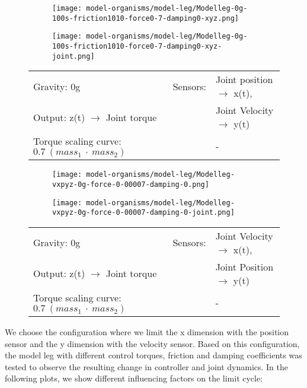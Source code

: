 \documentclass[main]{subfiles}
\begin{document}
\begin{figure}[H]
	\centering
		\begin{subfigure}[c]{0.45\textwidth}
	\texttt{[image: model-organisms/model-leg/Modelleg-0g-100s-friction1010-force0-7-damping0-xyz.png]}
		\end{subfigure}
	\begin{subfigure}[c]{0.45\textwidth}
	\texttt{[image: model-organisms/model-leg/Modelleg-0g-100s-friction1010-force0-7-damping0-xyz-joint.png]}
		\end{subfigure}
	\caption[Limited chaotic controller controlling model leg]{}
	\begin{tabular}{l|ll}
	\hline 
	Gravity: 0g  & Sensors: & Joint position \(\rightarrow\) x(t),\\
	 Output: z(t) \(\rightarrow\) Joint torque &  & Joint Velocity \(\rightarrow\) y(t) \\
	  Torque scaling curve: \(0.7~(mass_1~\cdot~mass_2)\) & & - \\
	  \hline
	\end{tabular}

	\label{figure:limited-model-leg5}
\end{figure}

\begin{figure}[H]
	\centering
		\begin{subfigure}[c]{0.45\textwidth}
	\texttt{[image: model-organisms/model-leg/Modelleg-vxpyz-0g-force-0-00007-damping-0.png]}
		\end{subfigure}
	\begin{subfigure}[c]{0.45\textwidth}
	\texttt{[image: model-organisms/model-leg/Modelleg-vxpyz-0g-force-0-00007-damping-0-joint.png]}
		\end{subfigure}
	\caption[Limited chaotic controller controlling model leg]{}
	\begin{tabular}{l|ll}
	\hline 
	Gravity: 0g  & Sensors: & Joint Velocity \(\rightarrow\) x(t),\\
	 Output: z(t) \(\rightarrow\) Joint torque & & Joint Position \(\rightarrow\) y(t) \\
	  Torque scaling curve: \(0.7~(mass_1~\cdot~mass_2)\) & & - \\
	  \hline
	\end{tabular}

	\label{figure:limited-model-leg6}
\end{figure}

We choose the configuration where we limit the x dimension with the position sensor and the y dimension with the velocity sensor. Based on this configuration, the model leg with different control torques, friction and damping coefficients was tested to observe the resulting change in controller and joint dynamics. In the following plots, we show different influencing factors on the limit cycle:
\end{document}
